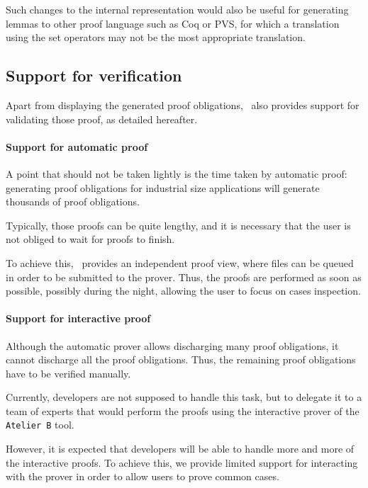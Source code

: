  Such changes to the internal representation would also be useful for
 generating lemmas to other proof language such as Coq or PVS, for
 which a translation using the set operators may not be the most
 appropriate translation.

\subsection{Support for verification}
Apart from displaying the generated proof obligations, \JACK\ also
provides support for validating those proof, as detailed hereafter.
\paragraph{Support for automatic proof}
\label{Support for automatic proof}
 A point that should not be taken lightly is the time taken by
automatic proof: generating proof obligations for industrial size
applications will generate thousands of proof obligations.

Typically, those proofs can be quite lengthy, and it is necessary that
the user is not obliged to wait for proofs to finish.

To achieve this, \JACK\ provides an independent proof view, where files can be queued in order to be submitted to
the prover. Thus, the proofs are performed as soon as possible, possibly during the night, allowing the user to
focus on cases inspection.
\paragraph{Support for interactive proof}
Although the automatic prover allows discharging many proof
obligations, it cannot discharge all the proof obligations. Thus, the
remaining proof obligations have to be verified manually.

Currently, developers are not supposed to handle this task, but to
delegate it to a team of experts that would perform the proofs using
the interactive prover of the \texttt{Atelier B} tool.

However, it is expected that developers will be able to handle more
and more of the interactive proofs. To achieve this, we provide
limited support for interacting with the prover in order to allow
users to prove common cases.

